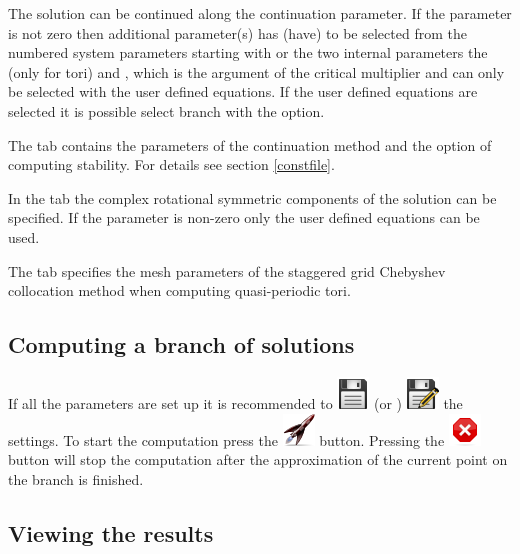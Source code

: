 \documentclass[10pt,a4paper]{ddedoc}
\newcommand{\iconRun}{\protect\includegraphics[height=0.8\baselineskip]{fig/cr32-action-launch}}
\newcommand{\iconStop}{\protect\includegraphics[height=0.8\baselineskip]{fig/cr32-action-stop}}
\newcommand{\iconSaveAs}{\protect\includegraphics[height=0.8\baselineskip]{fig/cr32-action-filesaveas}}
\newcommand{\iconSave}{\protect\includegraphics[height=0.8\baselineskip]{fig/cr32-action-filesave}}
\begin{document}
The solution can be continued along the  continuation parameter. If
the  parameter is not zero then additional parameter(s)
 has (have) to be selected from the numbered system parameters
starting with  or the two internal parameters the  (only for tori) and , which is the argument of the
critical multiplier and can only be selected with the user defined equations.
If the user defined equations are selected it is possible select branch with
the  option.

The  tab contains the parameters of the continuation method and
the option of computing stability. For details see section \ref{constfile}.

In the  tab the complex rotational symmetric components of the
solution can be specified. If the parameter  is non-zero only the
user defined equations can be used.

The  tab specifies the mesh parameters of the staggered grid
Chebyshev collocation method when computing quasi-periodic tori.

\subsection{Computing a branch of solutions}

If all the parameters are set up it is recommended to  \iconSave{}
(or ) \iconSaveAs{} the settings. To start the computation
press the  \iconRun{} button. Pressing the  \iconStop{}
button will stop the computation after the approximation of the current point on
the branch is finished.

\subsection{Viewing the results}
\end{document}
